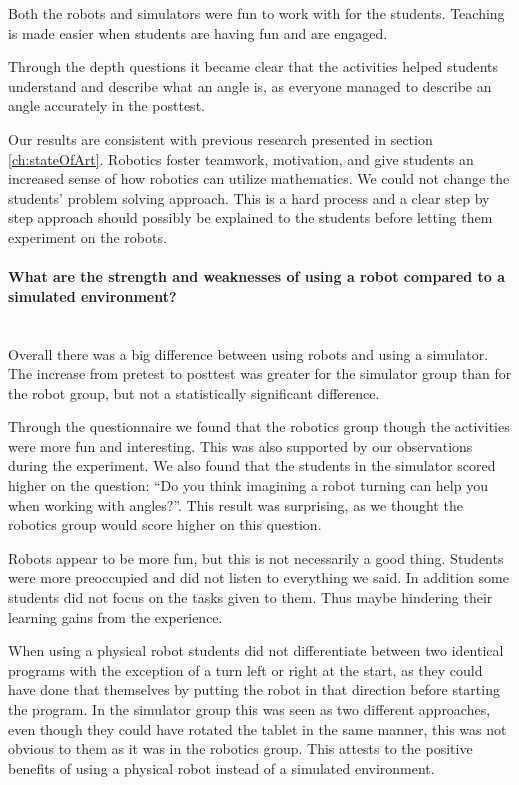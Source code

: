 \bigskip\noindent
Both the robots and simulators were fun to work with for the students. Teaching is made easier when students are having fun and are engaged.

\bigskip\noindent
Through the depth questions it became clear that the activities helped students understand and describe what an angle is, as everyone managed to describe an angle accurately in the posttest. 

\bigskip\noindent
Our results are consistent with previous research presented in section \ref{ch:stateOfArt}. Robotics foster teamwork, motivation, and give students an increased sense of how robotics can utilize mathematics. We could not change the students' problem solving approach. This is a hard process and a clear step by step approach should possibly be explained to the students before letting them experiment on the robots. 

\paragraph{What are the strength and weaknesses of using a robot compared to a simulated environment?}~\\
Overall there was a big difference between using robots and using a simulator.
The increase from pretest to posttest was greater for the simulator group than for the robot group, but not a statistically significant difference. 

\bigskip\noindent
Through the questionnaire we found that the robotics group though the activities were more fun and interesting. This was also supported by our observations during the experiment. We also found that the students in the simulator scored higher on the question: ``Do you think imagining a robot turning can help you when working with angles?''. This result was surprising, as we thought the robotics group would score higher on this question.

\bigskip\noindent
Robots appear to be more fun, but this is not necessarily a good thing. Students were more preoccupied and did not listen to everything we said. In addition some students did not focus on the tasks given to them. Thus maybe hindering their learning gains from the experience. 

\bigskip\noindent
When using a physical robot students did not differentiate between two identical programs with the exception of a turn left or right at the start, as they could have done that themselves by putting the robot in that direction before starting the program. In the simulator group this was seen as two different approaches, even though they could have rotated the tablet in the same manner, this was not obvious to them as it was in the robotics group. This attests to the positive benefits of using a physical robot instead of a simulated environment. 